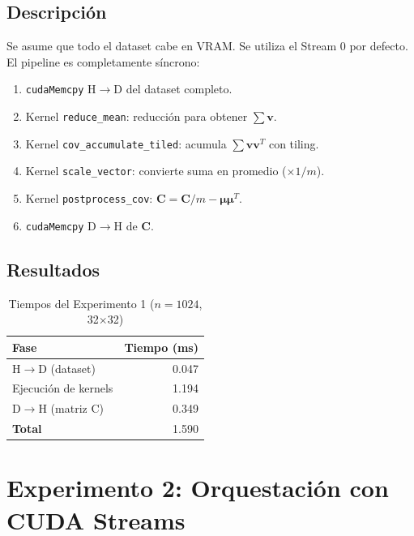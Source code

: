 \documentclass[12pt,a4paper]{article}
\begin{document}
\subsection{Descripción}

Se asume que todo el dataset cabe en VRAM. Se utiliza el Stream 0 por defecto.
El pipeline es completamente síncrono:

\begin{enumerate}
    \item \texttt{cudaMemcpy} H$\rightarrow$D del dataset completo.
    \item Kernel \texttt{reduce\_mean}: reducción para obtener $\sum\mathbf{v}$.
    \item Kernel \texttt{cov\_accumulate\_tiled}: acumula $\sum\mathbf{vv}^T$ con tiling.
    \item Kernel \texttt{scale\_vector}: convierte suma en promedio ($\times 1/m$).
    \item Kernel \texttt{postprocess\_cov}: $\mathbf{C} = \mathbf{C}/m - \boldsymbol{\mu\mu}^T$.
    \item \texttt{cudaMemcpy} D$\rightarrow$H de $\mathbf{C}$.
\end{enumerate}

\subsection{Resultados}

\begin{table}[H]
\centering
\begin{tabular}{lr}
\toprule
Fase & Tiempo (ms) \\
\midrule
H$\rightarrow$D (dataset) & 0.047 \\
Ejecución de kernels & 1.194 \\
D$\rightarrow$H (matriz C) & 0.349 \\
\midrule
\textbf{Total} & 1.590 \\
\bottomrule
\end{tabular}
\caption{Tiempos del Experimento 1 ($n=1024$, 32$\times$32)}
\end{table}

\section{Experimento 2: Orquestación con CUDA Streams}
\end{document}
